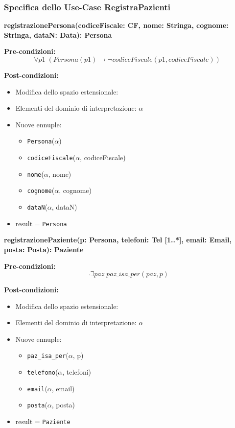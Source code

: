 \documentclass{article}
\begin{document}
\newpage
\subsubsection{Specifica dello Use-Case RegistraPazienti}

\textbf{registrazionePersona(codiceFiscale: CF, nome: Stringa, cognome: Stringa, dataN: Data): Persona}

\textbf{Pre-condizioni:} 
\[
\forall p1 \; (Persona(p1) \rightarrow \neg codiceFiscale(p1,codiceFiscale))
\]

\textbf{Post-condizioni:}
\begin{itemize}
    \item Modifica dello spazio estensionale:
    \item Elementi del dominio di interpretazione: \( \alpha \)
    \item Nuove ennuple:
    \begin{itemize}
        \item \texttt{Persona}(\(\alpha\))
        \item \texttt{codiceFiscale}(\(\alpha\), codiceFiscale)
        \item \texttt{nome}(\(\alpha\), nome)
        \item \texttt{cognome}(\(\alpha\), cognome)
        \item \texttt{dataN}(\(\alpha\), dataN)
    \end{itemize}
    \item result = \texttt{Persona}
\end{itemize}

\textbf{registrazionePaziente(p: Persona, telefoni: Tel [1..*], email: Email, posta: Posta): Paziente}

\textbf{Pre-condizioni:} 
\[
\neg \exists paz \; paz\_isa\_per(paz,p)
\]

\textbf{Post-condizioni:}
\begin{itemize}
    \item Modifica dello spazio estensionale:
    \item Elementi del dominio di interpretazione: \( \alpha \)
    \item Nuove ennuple:
    \begin{itemize}
        \item \texttt{paz\_isa\_per}(\(\alpha\), p)
        \item \texttt{telefono}(\(\alpha\), telefoni)
        \item \texttt{email}(\(\alpha\), email)
        \item \texttt{posta}(\(\alpha\), posta)
    \end{itemize}
    \item result = \texttt{Paziente}
\end{itemize}
\end{document}

